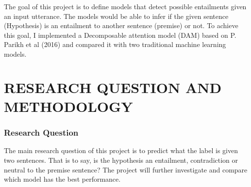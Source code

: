 \documentclass[runningheads]{llncs}
\begin{document}
The goal of this project is to define models that detect possible entailments given an input utterance. The models would be able to infer if the given sentence (Hypothesis) is an entailment to another sentence (premise) or not. To achieve this goal, I implemented a Decomposable attention model (DAM) based on P. Parikh et al (2016) and compared it with two traditional machine learning models.
\section{RESEARCH QUESTION AND METHODOLOGY}
\subsubsection{Research Question} The main research question of this project is to predict what
the label is given two sentences. That is to say, is the hypothesis an entailment, contradiction or neutral to the premise sentence? The project will further investigate and compare which model has the best performance.
\end{document}
